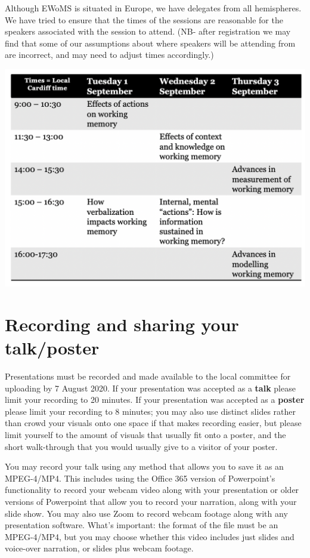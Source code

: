 \documentclass[
  12pt,
]{book}
\begin{document}
Although EWoMS is situated in Europe, we have delegates from all hemispheres. We have tried to ensure that the times of the sessions are reasonable for the speakers associated with the session to attend. (NB- after registration we may find that some of our assumptions about where speakers will be attending from are incorrect, and may need to adjust times accordingly.)

\includegraphics{ewomsSchedule.png}

\hypertarget{recording-and-sharing-your-talkposter}{%
\section{Recording and sharing your talk/poster}\label{recording-and-sharing-your-talkposter}}

Presentations must be recorded and made available to the local committee for uploading by 7 August 2020. If your presentation was accepted as a \textbf{talk} please limit your recording to 20 minutes. If your presentation was accepted as a \textbf{poster} please limit your recording to 8 minutes; you may also use distinct slides rather than crowd your visuals onto one space if that makes recording easier, but please limit yourself to the amount of visuals that usually fit onto a poster, and the short walk-through that you would usually give to a visitor of your poster.

You may record your talk using any method that allows you to save it as an MPEG-4/MP4. This includes using the Office 365 version of Powerpoint's functionality to record your webcam video along with your presentation or older versions of Powerpoint that allow you to record your narration, along with your slide show. You may also use Zoom to record webcam footage along with any presentation software. What's important: the format of the file must be an MPEG-4/MP4, but you may choose whether this video includes just slides and voice-over narration, or slides plus webcam footage.
\end{document}
